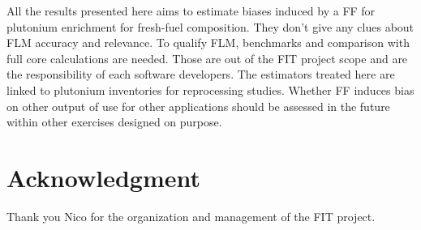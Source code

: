 All the results presented here aims to estimate biases induced by a \gls{FF} for plutonium enrichment for fresh-fuel composition.
They don't give any clues about \gls{FLM} accuracy and relevance.
To qualify \gls{FLM}, benchmarks and comparison with full core calculations are needed.
Those are out of the FIT project scope and are the responsibility of each software developers.
The estimators treated here are linked to plutonium inventories for reprocessing studies.
Whether \gls{FF} induces bias on other output of use for other applications should be assessed in the future within other exercises designed on purpose.

\section{Acknowledgment}
Thank you Nico for the organization and management of the FIT project.